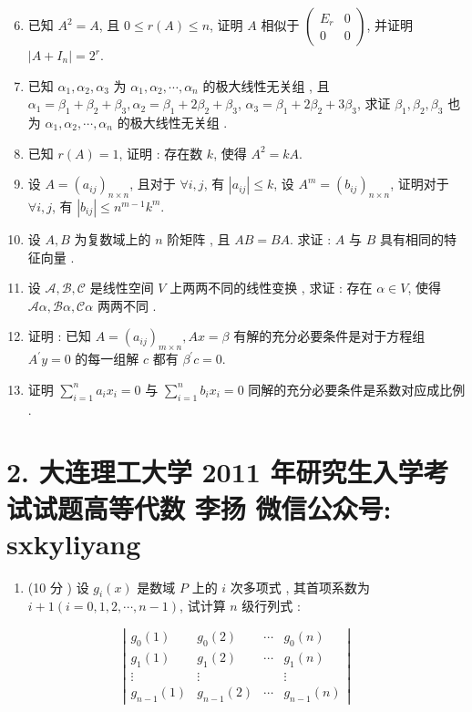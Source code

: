 \documentclass[10pt]{article}
\begin{document}
{\begin{enumerate}
  \setcounter{enumi}{5}
  \item  已知  $A^{2}=A$,  且  $0 \leqslant r(A) \leqslant n$,  证明  $A$  相似于  $\left(\begin{array}{cc}E_{r} & 0 \\ 0 & 0\end{array}\right)$,  并证明  $\left|A+I_{n}\right|=2^{r}$.

  \item  已知  $\alpha_{1}, \alpha_{2}, \alpha_{3}$  为  $\alpha_{1}, \alpha_{2}, \cdots, \alpha_{n}$  的极大线性无关组 ,  且  $\alpha_{1}=\beta_{1}+\beta_{2}+\beta_{3}, \alpha_{2}=\beta_{1}+2 \beta_{2}+\beta_{3}$, $\alpha_{3}=\beta_{1}+2 \beta_{2}+3 \beta_{3}$,  求证  $\beta_{1}, \beta_{2}, \beta_{3}$  也为  $\alpha_{1}, \alpha_{2}, \cdots, \alpha_{n}$  的极大线性无关组 .

  \item  已知  $r(A)=1$,  证明 :  存在数  $k$,  使得  $A^{2}=k A$.

  \item  设  $A=\left(a_{i j}\right)_{n \times n}$,  且对于  $\forall i, j$,  有  $\left|a_{i j}\right| \leqslant k$,  设  $A^{m}=\left(b_{i j}\right)_{n \times n}$,  证明对于  $\forall i, j$,  有  $\left|b_{i j}\right| \leqslant n^{m-1} k^{m}$.

  \item  设  $A, B$  为复数域上的  $n$  阶矩阵 ,  且  $A B=B A$.  求证 : $A$  与  $B$  具有相同的特征向量 .

  \item  设  $\mathscr{A}, \mathscr{B}, \mathscr{C}$  是线性空间  $V$  上两两不同的线性变换 ,  求证 :  存在  $\alpha \in V$,  使得  $\mathscr{A} \alpha, \mathscr{B} \alpha, \mathscr{C} \alpha$  两两不同 .

  \item  证明 :  已知  $A=\left(a_{i j}\right)_{m \times n}, A x=\beta$  有解的充分必要条件是对于方程组  $A^{\prime} y=0$  的每一组解  $c$  都有  $\beta^{\prime} c=0$.

  \item  证明  $\sum_{i=1}^{n} a_{i} x_{i}=0$  与  $\sum_{i=1}^{n} b_{i} x_{i}=0$  同解的充分必要条件是系数对应成比例 .

\end{enumerate}
\section{2. 大连理工大学 2011 年研究生入学考试试题高等代数 
 李扬 
 微信公众号: sxkyliyang}
\begin{enumerate}
  \item (10  分 )  设  $g_{i}(x)$  是数域  $P$  上的  $i$  次多项式 ,  其首项系数为  $i+1(i=0,1,2, \cdots, n-1)$,  试计算  $n$  级行列式 :
\end{enumerate}
$$
\left|\begin{array}{cccc}
g_{0}(1) & g_{0}(2) & \cdots & g_{0}(n) \\
g_{1}(1) & g_{1}(2) & \cdots & g_{1}(n) \\
\vdots & \vdots & & \vdots \\
g_{n-1}(1) & g_{n-1}(2) & \cdots & g_{n-1}(n)
\end{array}\right|
$$

}
\end{document}
